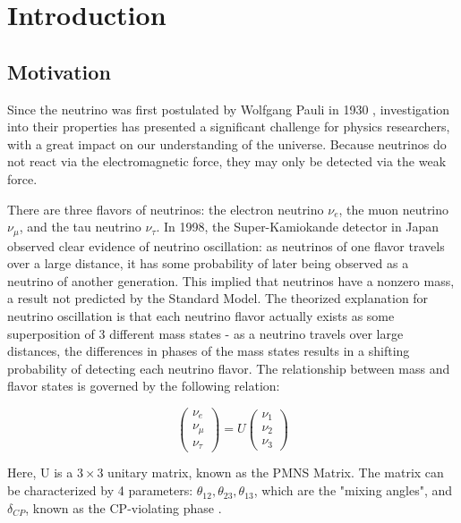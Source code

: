 
\chapter{Introduction}
\label{ch:Introduction}

\section{Motivation}
\label{sec:Motivation}

Since the neutrino was first postulated by Wolfgang Pauli in 1930 \cite{neutrinoHistory}, investigation into their properties has presented a significant challenge for physics researchers, with a great impact on our understanding of the universe.
Because neutrinos do not react via the electromagnetic force, they may only be detected via the weak force.

There are three flavors of neutrinos: the electron neutrino $\nu_e$, the muon neutrino $\nu_\mu$, and the tau neutrino $\nu_\tau$.
In 1998, the Super-Kamiokande detector in Japan observed clear evidence of neutrino oscillation: as neutrinos of one flavor travels over a large distance, it has some probability of later being observed as a neutrino of another generation.
This implied that neutrinos have a nonzero mass, a result not predicted by the Standard Model.
The theorized explanation for neutrino oscillation is that each neutrino flavor actually exists as some superposition of 3 different mass states - as a neutrino travels over large distances, the differences in phases of the mass states results in a shifting probability of detecting each neutrino flavor.
The relationship between mass and flavor states is governed by the following relation:

\[
\begin{pmatrix}
\nu_e \\ \nu_\mu \\ \nu_\tau
\end{pmatrix}
=
U \begin{pmatrix}
\nu_1 \\ \nu_2 \\ \nu_3
\end{pmatrix}
\]

Here, U is a $3 \times 3$ unitary matrix, known as the PMNS Matrix.
The matrix can be characterized by 4 parameters: $\theta_{12}, \theta_{23}, \theta_{13}$, which are the "mixing angles", and $\delta_{CP}$, known as the CP-violating phase \cite{pdg2018}. 

